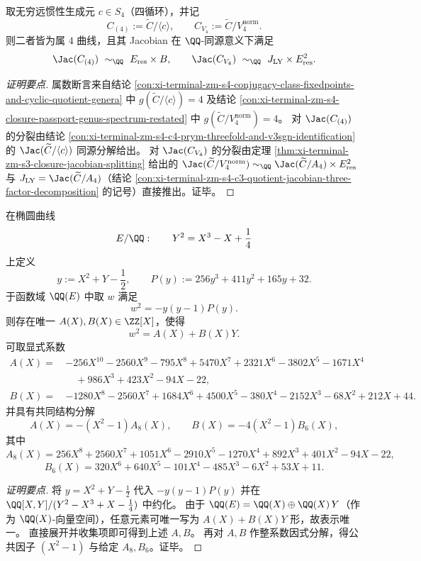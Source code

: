\begin{conclusion}\label{con:xi-terminal-zm-s4-c4-v4-quotient-jacobian-pure-splitting}
取无穷远惯性生成元 \(c\in S_4\)（四循环），并记
\[
C_{(4)}:=\widetilde C/\langle c\rangle,\qquad
C_{V_4}:=\widetilde C/V_4^{\mathrm{norm}}.
\]
则二者皆为属 \(4\) 曲线，且其 Jacobian 在 \(\QQ\)-同源意义下满足
\[
\Jac(C_{(4)})\ \sim_{\QQ}\ E_{\mathrm{res}}\times B,\qquad
\Jac(C_{V_4})\ \sim_{\QQ}\ J_{\mathrm{LY}}\times E_{\mathrm{res}}^2.
\]
\end{conclusion}
\begin{proof}[证明要点]
属数断言来自结论 \ref{con:xi-terminal-zm-s4-conjugacy-class-fixedpoints-and-cyclic-quotient-genera} 中
\(
g(\widetilde C/\langle c\rangle)=4
\)
及结论 \ref{con:xi-terminal-zm-s4-closure-passport-genus-spectrum-restated} 中
\(
g(\widetilde C/V_4^{\mathrm{norm}})=4
\)。
对 \(\Jac(C_{(4)})\) 的分裂由结论 \ref{con:xi-terminal-zm-s4-c4-prym-threefold-and-v3sgn-identification} 的 \(\Jac(\widetilde C/\langle c\rangle)\) 同源分解给出。
对 \(\Jac(C_{V_4})\) 的分裂由定理 \ref{thm:xi-terminal-zm-s3-closure-jacobian-splitting} 给出的
\(
\Jac(\widetilde C/V_4^{\mathrm{norm}})\sim_{\QQ}\Jac(\widetilde C/A_4)\times E_{\mathrm{res}}^2
\)
与 \(J_{\mathrm{LY}}=\Jac(\widetilde C/A_4)\)（结论 \ref{con:xi-terminal-zm-s4-c3-quotient-jacobian-three-factor-decomposition} 的记号）直接推出。证毕。
\end{proof}



\begin{conclusion}\label{con:xi-terminal-zm-leyang-doublecover-linearization-a-plus-by}
在椭圆曲线
\[
E/\QQ:\qquad Y^2=X^3-X+\frac14
\]
上定义
\[
y:=X^2+Y-\frac12,\qquad
P(y):=256y^3+411y^2+165y+32.
\]
于函数域 \(\QQ(E)\) 中取 \(w\) 满足
\[
w^2=-y(y-1)P(y).
\]
则存在唯一 \(A(X),B(X)\in\ZZ[X]\)，使得
\[
w^2=A(X)+B(X)Y.
\]
可取显式系数
\[
\begin{aligned}
A(X)=\,&-256X^{10}-2560X^9-795X^8+5470X^7+2321X^6-3802X^5-1671X^4\\
&\quad+986X^3+423X^2-94X-22,
\end{aligned}
\]
\[
\begin{aligned}
B(X)=\,&-1280X^8-2560X^7+1684X^6+4500X^5-380X^4-2152X^3-68X^2+212X+44.
\end{aligned}
\]
并具有共同结构分解
\[
A(X)=-(X^2-1)A_8(X),\qquad
B(X)=-4(X^2-1)B_6(X),
\]
其中
\[
A_8(X)=256X^8+2560X^7+1051X^6-2910X^5-1270X^4+892X^3+401X^2-94X-22,
\]
\[
B_6(X)=320X^6+640X^5-101X^4-485X^3-6X^2+53X+11.
\]
\end{conclusion}
\begin{proof}[证明要点]
将 \(y=X^2+Y-\frac12\) 代入 \(-y(y-1)P(y)\) 并在 \(\QQ[X,Y]/(Y^2-X^3+X-\frac14)\) 中约化。
由于 \(\QQ(E)=\QQ(X)\oplus \QQ(X)\,Y\)（作为 \(\QQ(X)\)-向量空间），任意元素可唯一写为 \(A(X)+B(X)Y\) 形，故表示唯一。
直接展开并收集项即可得到上述 \(A,B\)。
再对 \(A,B\) 作整系数因式分解，得公共因子 \((X^2-1)\) 与给定 \(A_8,B_6\)。证毕。
\end{proof}

